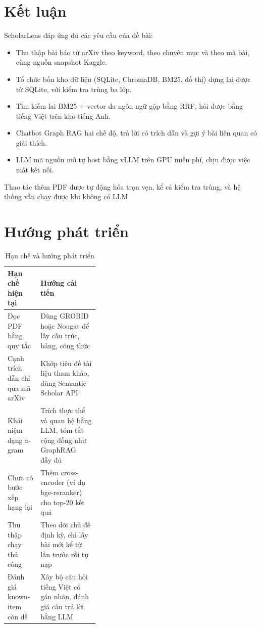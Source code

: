 \section{Kết luận}

ScholarLens đáp ứng đủ các yêu cầu của đề bài:
\begin{itemize}
\item Thu thập bài báo từ arXiv theo keyword, theo chuyên mục và theo mã bài, cùng nguồn snapshot Kaggle.
\item Tổ chức bốn kho dữ liệu (SQLite, ChromaDB, BM25, đồ thị) dựng lại được từ SQLite, với kiểm tra trùng ba lớp.
\item Tìm kiếm lai BM25 + vector đa ngôn ngữ gộp bằng RRF, hỏi được bằng tiếng Việt trên kho tiếng Anh.
\item Chatbot Graph RAG hai chế độ, trả lời có trích dẫn và gợi ý bài liên quan có giải thích.
\item LLM mã nguồn mở tự host bằng vLLM trên GPU miễn phí, chịu được việc mất kết nối.
\end{itemize}
Thao tác thêm PDF được tự động hóa trọn vẹn, kể cả kiểm tra trùng, và hệ thống vẫn chạy được khi không có LLM.

\section{Hướng phát triển}

\begin{table}[H]
\centering\small{}
\begin{tabularx}{\linewidth}{@{}P{0.36\linewidth}L@{}}
\toprule
\textbf{Hạn chế hiện tại} & \textbf{Hướng cải tiến}\\
\midrule
Đọc PDF bằng quy tắc & Dùng GROBID hoặc Nougat để lấy cấu trúc, bảng, công thức\\
Cạnh trích dẫn chỉ qua mã arXiv & Khớp tiêu đề tài liệu tham khảo, dùng Semantic Scholar API\\
Khái niệm dạng n-gram & Trích thực thể và quan hệ bằng LLM, tóm tắt cộng đồng như GraphRAG~\cite{graphrag} đầy đủ\\
Chưa có bước xếp hạng lại & Thêm cross-encoder (ví dụ bge-reranker) cho top-20 kết quả\\
Thu thập chạy thủ công & Theo dõi chủ đề định kỳ, chỉ lấy bài mới kể từ lần trước rồi tự nạp\\
Đánh giá known-item còn dễ & Xây bộ câu hỏi tiếng Việt có gán nhãn, đánh giá câu trả lời bằng LLM\\
\bottomrule
\end{tabularx}
\caption{Hạn chế và hướng phát triển}\label{tab:huongphattrien}
\end{table}
